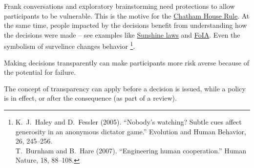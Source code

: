 Frank conversations and exploratory brainstorming need protections to allow participants to be vulnerable. This is the motive for the \href{https://en.wikipedia.org/wiki/Chatham_House_Rule}{Chatham House Rule}. At the same time, people impacted by the decisions benefit from understanding how the decisions were made -- see examples like 
\href{https://en.wikipedia.org/wiki/Government_in_the_Sunshine_Act}{Sunshine laws} and \href{https://en.wikipedia.org/wiki/Freedom_of_Information_Act_(United_States)}{FoIA}. Even the symbolism of survelince changes behavior
\footnote{K.~J.~Haley and D.~Fessler (2005). ``Nobody’s watching? Subtle cues affect generosity in an anonymous dictator game.'' Evolution and Human Behavior, 26, 245–256.\\
T.~Burnham and B.~Hare (2007). ``Engineering human cooperation.'' Human Nature, 18, 88–108.}.

Making decisions transparently can make participants more risk averse because of the potential for failure. 

The concept of transparency can apply before a decision is issued, while a policy is in effect, or after the consequence (as part of a review). 
